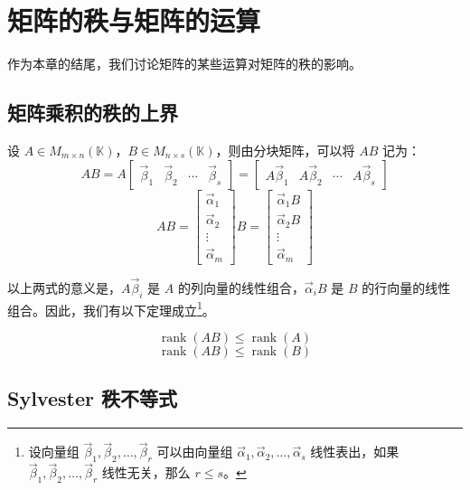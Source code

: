 
\section{矩阵的秩与矩阵的运算}

作为本章的结尾，我们讨论矩阵的某些运算对矩阵的秩的影响。

\subsection{矩阵乘积的秩的上界}

设 $A \in M_{m \times n}(\mathbb K)$，$B \in M_{n \times s}(\mathbb K)$，则由分块矩阵，可以将 $AB$ 记为：
$$
AB = A
\begin{bmatrix} \vec \beta_1 & \vec \beta_2 & \cdots & \vec \beta_s \end{bmatrix}
=
\begin{bmatrix} A \vec \beta_1 & A \vec \beta_2 & \cdots & A \vec \beta_s \end{bmatrix}
$$$$
AB =
\begin{bmatrix} \vec \alpha_1 \\ \vec \alpha_2 \\ \vdots \\ \vec \alpha_m \end{bmatrix}
B =
\begin{bmatrix} \vec \alpha_1 B \\ \vec \alpha_2 B \\ \vdots \\ \vec \alpha_m \end{bmatrix}
$$

以上两式的意义是，$A \vec \beta_i$ 是 $A$ 的列向量的线性组合，$\vec \alpha_i B$ 是 $B$ 的行向量的线性组合。因此，我们有以下定理成立\footnote{设向量组 $\vec \beta_1, \vec \beta_2, \ldots, \vec \beta_r$ 可以由向量组 $\vec \alpha_1, \vec \alpha_2, \ldots, \vec \alpha_s$ 线性表出，如果 $\vec \beta_1, \vec \beta_2, \ldots, \vec \beta_r$ 线性无关，那么 $r \le s$。}。

\begin{theorem}[矩阵乘积的秩的上界]
	$$
	\operatorname{rank}(AB) \le \operatorname{rank}(A)
	$$$$
	\operatorname{rank}(AB) \le \operatorname{rank}(B)
	$$
\end{theorem}

\subsection{Sylvester 秩不等式}

